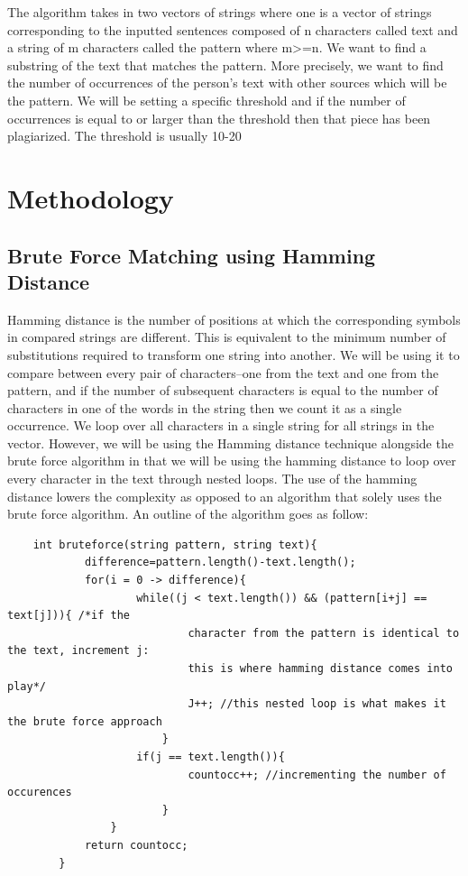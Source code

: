 \documentclass{article}
\theoremstyle{plain}
\begin{document}
The algorithm takes in two vectors of strings where one is a vector of strings corresponding to the inputted sentences composed of n characters called text and a string of m characters called the pattern where m>=n.  We want to find a substring of the text that matches the pattern. More precisely, we want to find the number of occurrences of the person's text with other sources which will be the pattern. We will be setting a specific threshold and if the number of occurrences is equal to or larger than the threshold then that piece has been plagiarized. The threshold is usually 10-20%

\newpage
\section*{Methodology}
\subsection*{Brute Force Matching using Hamming Distance}
Hamming distance is the number of positions at which the corresponding symbols in compared strings are different. This is equivalent to the minimum number of substitutions required to transform one string into another. We will be using it to compare between every pair of characters–one from the text and one from the pattern, and if the number of subsequent characters is equal to the number of characters in one of the words in the string then we count it as a single occurrence. We loop over all characters in a single string for all strings in the vector. However, we will be using the Hamming distance technique alongside the brute force algorithm in that we will be using the hamming distance to loop over every character in the text through nested loops. The use of the hamming distance lowers the complexity as opposed to an algorithm that solely uses the brute force algorithm. An outline of the algorithm goes as follow:

\begin{Verbatim}
    int bruteforce(string pattern, string text){
            difference=pattern.length()-text.length();
            for(i = 0 -> difference){
                    while((j < text.length()) && (pattern[i+j] == text[j])){ /*if the
                            character from the pattern is identical to the text, increment j:
                            this is where hamming distance comes into play*/
                            J++; //this nested loop is what makes it the brute force approach
                        }
                    if(j == text.length()){
                            countocc++; //incrementing the number of occurences
                        }
                }
            return countocc;
        }
\end{Verbatim}
\newpage
\end{document}
